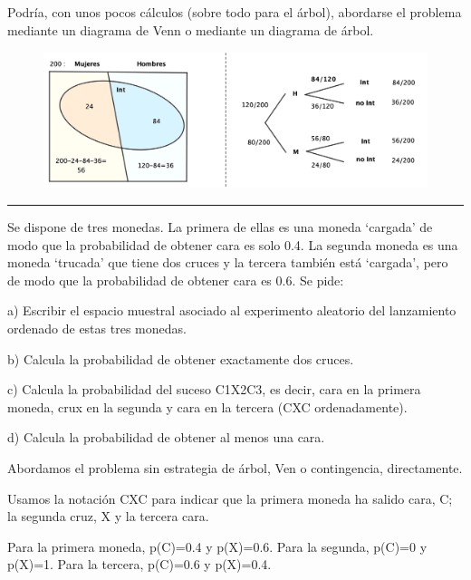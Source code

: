 Podría, con unos pocos cálculos (sobre todo para el árbol), abordarse el problema mediante un diagrama de Venn o mediante un diagrama de árbol.
	\begin{figure}[H]
				\centering
			\includegraphics[width=1\textwidth]{imagenes/imagenes02/T02IM36.png}
	\end{figure}
\begin{flushright}
\vspace{-5mm}\textcolor{gris}{\rule{100mm}{0.1mm}}	
\end{flushright}



\vspace{5mm}
\begin{ejemplo}
\begin{ejer}
Se dispone de tres monedas. La primera de ellas es una moneda `cargada' de modo que la probabilidad de obtener cara es solo 0.4. La segunda moneda es una moneda `trucada' que tiene dos cruces y la tercera también está `cargada', pero de modo que la probabilidad de obtener cara es 0.6. Se pide:

a) Escribir el espacio muestral asociado al experimento aleatorio del lanzamiento ordenado de estas tres monedas.

b) Calcula la probabilidad de obtener exactamente dos cruces.

c) Calcula la probabilidad del suceso C1X2C3, es decir, cara en la primera moneda, crux en la segunda y cara en la tercera (CXC ordenadamente).

d) Calcula la probabilidad de obtener al menos una cara.
\end{ejer}
\end{ejemplo}
Abordamos el problema sin estrategia de árbol, Ven o contingencia, directamente.

Usamos la notación CXC para indicar que la primera moneda ha salido cara, C; la segunda cruz, X y la tercera cara. 

Para la primera moneda, p(C)=0.4 y p(X)=0.6. Para la segunda, p(C)=0 y p(X)=1. Para la tercera, p(C)=0.6 y p(X)=0.4.

